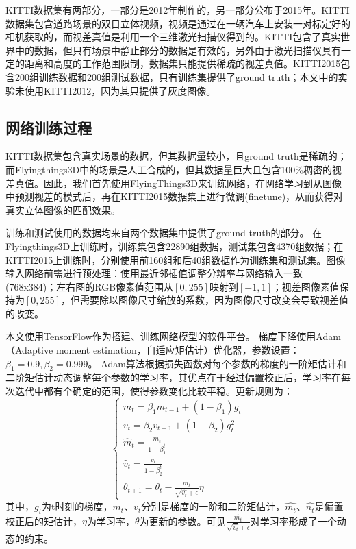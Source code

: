 KITTI数据集有两部分，一部分是2012年制作的\cite{Geiger2012}，另一部分公布于2015年\cite{Menze_2015_CVPR}。KITTI数据集包含道路场景的双目立体视频，视频是通过在一辆汽车上安装一对标定好的相机获取的，而视差真值是利用一个三维激光扫描仪得到的。KITTI包含了真实世界中的数据，但只有场景中静止部分的数据是有效的，另外由于激光扫描仪具有一定的距离和高度的工作范围限制，数据集只能提供稀疏的视差真值。KITTI2015包含200组训练数据和200组测试数据，只有训练集提供了ground truth；本文中的实验未使用KITTI2012，因为其只提供了灰度图像。


\subsection{网络训练过程}
KITTI数据集包含真实场景的数据，但其数据量较小，且ground truth是稀疏的；而Flyingthings3D中的场景是人工合成的，但其数据量巨大且包含100\%稠密的视差真值。因此，我们首先使用FlyingThings3D来训练网络，在网络学习到从图像中预测视差的模式后，再在KITTI2015数据集上进行微调(finetune)，从而获得对真实立体图像的匹配效果。

训练和测试使用的数据均来自两个数据集中提供了ground truth的部分。
在Flyingthings3D上训练时，训练集包含22890组数据，测试集包含4370组数据；在KITTI2015上训练时，分别使用前160组和后40组数据作为训练集和测试集。图像输入网络前需进行预处理：使用最近邻插值调整分辨率与网络输入一致(768x384)；左右图的RGB像素值范围从$[0, 255]$映射到$[-1, 1]$；视差图像素值保持为$[0, 255]$，但需要除以图像尺寸缩放的系数，因为图像尺寸改变会导致视差值的改变。

本文使用TensorFlow\cite{abadi2016tensorflow}作为搭建、训练网络模型的软件平台。
梯度下降使用Adam（Adaptive moment estimation，自适应矩估计）优化器\cite{kingma2014adam}，参数设置：$\beta_1=0.9, \beta_2=0.999$。
Adam算法根据损失函数对每个参数的梯度的一阶矩估计和二阶矩估计动态调整每个参数的学习率，其优点在于经过偏置校正后，学习率在每次迭代中都有个确定的范围，使得参数变化比较平稳。更新规则为：
\begin{equation}\label{eq_4_2_Adam}
\begin{cases}
m_t = \beta_1 m_{t-1} + (1 - \beta_1)g_t \\
v_t = \beta_2 v_{t-1} + (1 - \beta_2) g_t^2 \\
\hat{m}_t = \frac{m_t}{1 - \beta_1^t} \\
\hat{v}_t = \frac{v_t}{1 - \beta_2^{t}} \\
\theta_{t+1} = \theta_t - \frac{\hat{m}_t}{\sqrt{\hat{v_t} + \epsilon}} \eta
\end{cases}
\end{equation}
其中，$g_t$为t时刻的梯度，$m_t$、$v_t$分别是梯度的一阶和二阶矩估计，$\hat{m_t}$、$\hat{n_t}$是偏置校正后的矩估计，$\eta$为学习率，$\theta$为更新的参数。可见$\frac{\hat{m_t}}{\sqrt{\hat{v_t}}+\epsilon}$对学习率形成了一个动态的约束。

